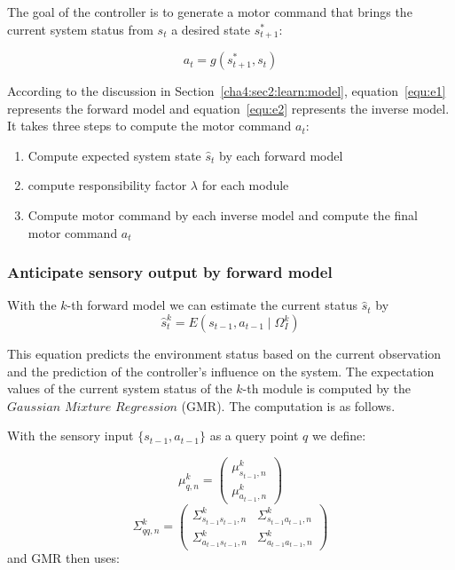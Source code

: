 The goal of the controller is to generate a motor command that brings the current system status from $s_t$ a desired state $s^*_{t+1}$:

\begin{equation}
\label{equ:e2}
a_t = g\left({s^*_{t+1},s_t}\right)
\end{equation}

According to the discussion in Section~\ref{cha4:sec2:learn:model}, equation~\ref{equ:e1} represents the forward model and equation~\ref{equ:e2} represents the inverse model. It takes three steps to compute the motor command $a_t$:
\begin{enumerate}
\item Compute expected system state $\hat{s}_t$ by each forward model
\item compute responsibility factor $\lambda$ for each module
\item Compute motor command by each inverse model and compute the final motor command $a_t$
\end{enumerate}


\subsubsection{Anticipate sensory output by forward model}
\label{cha4:sec2:control:forward}
With the $k$-th forward model we can estimate the current status $\hat{s}_t$ by
\begin{equation}
\label{equ:e3}
\hat{s}^k_{t} = E\left({s_{t-1}, a_{t-1} \mid \Omega^k_I}\right)
\end{equation}

%

This equation predicts the environment status based on the current observation and the prediction of the controller's influence on the system. The expectation values of the current system status of the $k$-th module is computed by the $Gaussian$ $Mixture$ $Regression$ (GMR). The computation is as follows.

With the sensory input $\{s_{t-1},a_{t-1}\}$ as a query point $q$ we define:

\begin{equation}
{
 {\mu}_{q,n}^k = \begin{pmatrix} {\mu}_{s_{t-1},n}^k    \\
                                        {\mu}_{a_{t-1},n}^k
                        \end{pmatrix}
}
\end{equation}
\begin{equation}
{
{\Sigma}_{qq,n}^k =  \begin{pmatrix} {\Sigma}_{s_{t-1}s_{t-1},n}^k  & {\Sigma}_{s_{t-1}{a_{t-1},n}}^k  \\
                                            {\Sigma}_{{a_{t-1}}{s_{t-1}},n}^k  & {\Sigma}_{{a_{t-1}}{a_{t-1}},n}^k
                            \end{pmatrix}
}
\end{equation}
and GMR then uses:

